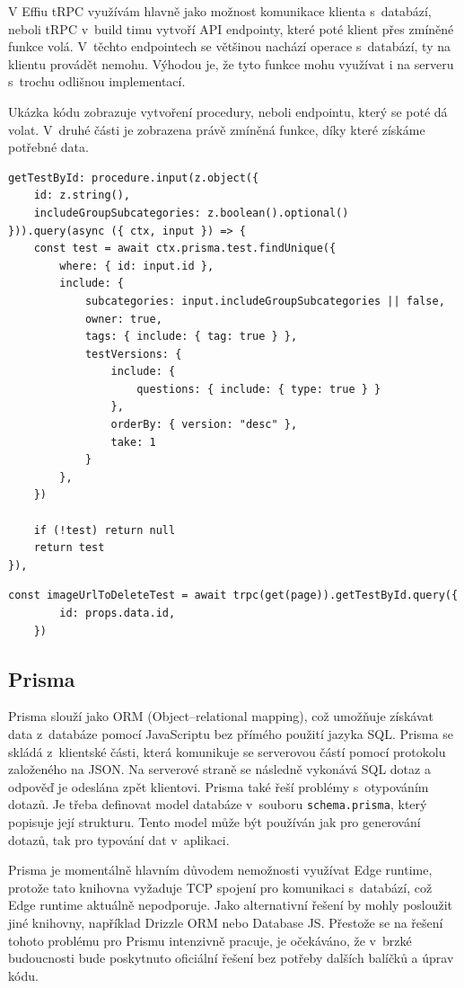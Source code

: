 \documentclass[12pt, a4paper,
openright
]{report}
\begin{document}
V Effiu tRPC využívám hlavně jako možnost komunikace klienta s~databází, neboli tRPC v~build timu vytvoří API endpointy, které poté klient přes zmíněné funkce volá. V~těchto endpointech se většinou nachází operace s~databází, ty na klientu provádět nemohu. Výhodou je, že tyto funkce mohu využívat i na serveru s~trochu odlišnou implementací.

Ukázka kódu zobrazuje vytvoření procedury, neboli endpointu, který se poté dá volat. V~druhé části je zobrazena právě zmíněná funkce, díky které získáme potřebné data.

\begin{lstlisting}[style=ES6, caption=Endpoint generovaný pomocí tRPC, label=trpc_code]
getTestById: procedure.input(z.object({
	id: z.string(),
	includeGroupSubcategories: z.boolean().optional()
})).query(async ({ ctx, input }) => {
	const test = await ctx.prisma.test.findUnique({
		where: { id: input.id },
		include: {
			subcategories: input.includeGroupSubcategories || false,
			owner: true,
			tags: {	include: { tag: true } },
			testVersions: {
				include: {
					questions: { include: { type: true } }
				},
				orderBy: { version: "desc" },
				take: 1
			}
		},
	})
	
	if (!test) return null
	return test
}),
\end{lstlisting}
\clearpage
\begin{lstlisting}[style=ES6, caption=Volání funkce pomocí tRPC klienta s metodou getTestById, label=trpc_code_use]
	const imageUrlToDeleteTest = await trpc(get(page)).getTestById.query({
		id: props.data.id,
	})
\end{lstlisting}
\subsection{Prisma}
Prisma slouží jako ORM (Object–relational mapping), což umožňuje získávat data z~databáze pomocí JavaScriptu bez přímého použití jazyka SQL. Prisma se skládá z~klientské části, která komunikuje se serverovou částí pomocí protokolu založeného na JSON. Na serverové straně se následně vykonává SQL dotaz a odpověď je odeslána zpět klientovi. Prisma také řeší problémy s~otypováním dotazů. Je třeba definovat model databáze v~souboru \texttt{schema.prisma}, který popisuje její strukturu. Tento model může být používán jak pro generování dotazů, tak pro typování dat v~aplikaci.

Prisma je momentálně hlavním důvodem nemožnosti využívat Edge runtime, protože tato knihovna vyžaduje TCP spojení pro komunikaci s~databází, což Edge runtime aktuálně nepodporuje. Jako alternativní řešení by mohly posloužit jiné knihovny, například Drizzle ORM nebo Database JS. Přestože se na řešení tohoto problému pro Prismu intenzivně pracuje, je očekáváno, že v~brzké budoucnosti bude poskytnuto oficiální řešení bez potřeby dalších balíčků a úprav kódu.
\end{document}
